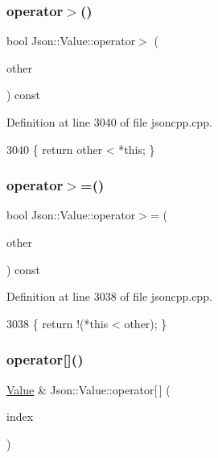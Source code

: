 \subsubsection{\texorpdfstring{operator$>$()}{operator>()}}
{\footnotesize\ttfamily bool Json\+::\+Value\+::operator$>$ (\begin{DoxyParamCaption}\item[{const \hyperlink{class_json_1_1_value}{Value} \&}]{other }\end{DoxyParamCaption}) const}



Definition at line 3040 of file jsoncpp.\+cpp.


\begin{DoxyCode}
3040 \{ \textcolor{keywordflow}{return} other < *\textcolor{keyword}{this}; \}
\end{DoxyCode}
\mbox{\label{class_json_1_1_value_afe2c3e52df60b9622cbd8358b74bdbf5}} 
\subsubsection{\texorpdfstring{operator$>$=()}{operator>=()}}
{\footnotesize\ttfamily bool Json\+::\+Value\+::operator$>$= (\begin{DoxyParamCaption}\item[{const \hyperlink{class_json_1_1_value}{Value} \&}]{other }\end{DoxyParamCaption}) const}



Definition at line 3038 of file jsoncpp.\+cpp.


\begin{DoxyCode}
3038 \{ \textcolor{keywordflow}{return} !(*\textcolor{keyword}{this} < other); \}
\end{DoxyCode}
\mbox{\label{class_json_1_1_value_a7d99f5dba388cdaa152ce6ef933d64ef}} 
\subsubsection{\texorpdfstring{operator[]()}{operator[]()}\hspace{0.1cm}{\footnotesize\ttfamily [1/9]}}
{\footnotesize\ttfamily \hyperlink{class_json_1_1_value}{Value} \& Json\+::\+Value\+::operator\mbox{[}$\,$\mbox{]} (\begin{DoxyParamCaption}\item[{\hyperlink{class_json_1_1_value_a184a91566cccca7b819240f0d5561c7d}{Array\+Index}}]{index }\end{DoxyParamCaption})}

